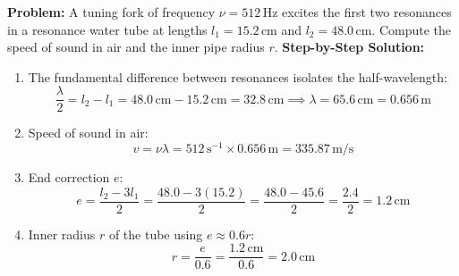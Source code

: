\documentclass[10pt,a4paper]{article}
\begin{document}
\begin{usecasebox}
\textbf{Problem:} A tuning fork of frequency $\nu = 512\,\mathrm{Hz}$ excites the first two resonances in a resonance water tube at lengths $l_1 = 15.2\,\mathrm{cm}$ and $l_2 = 48.0\,\mathrm{cm}$. Compute the speed of sound in air and the inner pipe radius $r$.
\textbf{Step-by-Step Solution:}
\begin{enumerate}
  \item The fundamental difference between resonances isolates the half-wavelength:
  \begin{equation}
    \frac{\lambda}{2} = l_2 - l_1 = 48.0\,\mathrm{cm} - 15.2\,\mathrm{cm} = 32.8\,\mathrm{cm} \implies \lambda = 65.6\,\mathrm{cm} = 0.656\,\mathrm{m}
  \end{equation}
  \item Speed of sound in air:
  \begin{equation}
    v = \nu \lambda = 512\,\mathrm{s}^{-1} \times 0.656\,\mathrm{m} = \mathbf{335.87\,\mathrm{m/s}}
  \end{equation}
  \item End correction $e$:
  \begin{equation}
    e = \frac{l_2 - 3l_1}{2} = \frac{48.0 - 3(15.2)}{2} = \frac{48.0 - 45.6}{2} = \frac{2.4}{2} = \mathbf{1.2\,\mathrm{cm}}
  \end{equation}
  \item Inner radius $r$ of the tube using $e \approx 0.6 r$:
  \begin{equation}
    r = \frac{e}{0.6} = \frac{1.2\,\mathrm{cm}}{0.6} = \mathbf{2.0\,\mathrm{cm}}
  \end{equation}
\end{enumerate}
\end{usecasebox}
\end{document}
